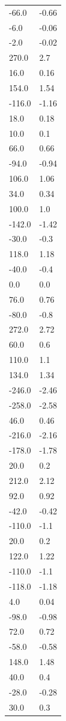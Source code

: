 \begin{longtable}{ll}
-66.0 & -0.66 \\
-6.0 & -0.06 \\
-2.0 & -0.02 \\
270.0 & 2.7 \\
16.0 & 0.16 \\
154.0 & 1.54 \\
-116.0 & -1.16 \\
18.0 & 0.18 \\
10.0 & 0.1 \\
66.0 & 0.66 \\
-94.0 & -0.94 \\
106.0 & 1.06 \\
34.0 & 0.34 \\
100.0 & 1.0 \\
-142.0 & -1.42 \\
-30.0 & -0.3 \\
118.0 & 1.18 \\
-40.0 & -0.4 \\
0.0 & 0.0 \\
76.0 & 0.76 \\
-80.0 & -0.8 \\
272.0 & 2.72 \\
60.0 & 0.6 \\
110.0 & 1.1 \\
134.0 & 1.34 \\
-246.0 & -2.46 \\
-258.0 & -2.58 \\
46.0 & 0.46 \\
-216.0 & -2.16 \\
-178.0 & -1.78 \\
20.0 & 0.2 \\
212.0 & 2.12 \\
92.0 & 0.92 \\
-42.0 & -0.42 \\
-110.0 & -1.1 \\
20.0 & 0.2 \\
122.0 & 1.22 \\
-110.0 & -1.1 \\
-118.0 & -1.18 \\
4.0 & 0.04 \\
-98.0 & -0.98 \\
72.0 & 0.72 \\
-58.0 & -0.58 \\
148.0 & 1.48 \\
40.0 & 0.4 \\
-28.0 & -0.28 \\
30.0 & 0.3 \\

\end{longtable}
